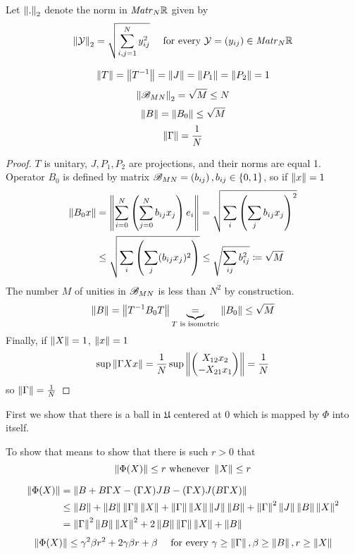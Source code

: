 \documentclass{article}
\begin{document}
Let \( \normex{2}{.} \) denote the norm in \( \matr{N}{\RR} \) given by
\[\normex{2}{\mathcal Y} = \sqrt{\sum_{i,j=1}^N y_{ij}^2} \quad\text{ for every } \mathcal Y = \left(y_{ij}\right) \in \matr{N}{\RR}\]
\begin{lemma}
    \[\norm T = \norm{T^{-1}} = \norm J = \norm{P_1} = \norm{P_2} = 1\]
    \[\normex{2}{\perturbmatrix{M}{N}} = \sqrt{M} \leq N\]
    \[\norm B = \norm{B_0} \leq \sqrt M\]
    \[\norm{\Gamma} = \frac{1}{N}\]
\end{lemma}
\begin{proof}
    \( T \) is unitary, \( J, P_1, P_2 \) are projections, and their norms are equal 1.
    Operator \( B_0 \) is defined by matrix \( \perturbmatrix{M}{N} = \left(b_{ij}\right), b_{ij}\in\{0,1\} \),
    so if \( \norm x = 1 \)
    \[
        \begin{split}
            \norm{B_0 x} &= \norm{\sum_{i=0}^N \left(\sum_{j=0}^N b_{ij} x_j\right) e_i}
            = \sqrt{\sum_i \left(\sum_j b_{ij} x_j\right)^2} \\
            &\leq \sqrt{\sum_i \left(\sum_j (b_{ij} x_j)^2\right)}
            \leq \sqrt{\sum_{ij} b_{ij}^2} \eqdef \sqrt M
        \end{split}
    \]
The number \( M \) of unities in \( \perturbmatrix{M}{N} \) is less than \( N^2 \) by construction.
\[\norm B = \norm{T^{-1} B_0 T} \underbrace{=}_{T \text{ is isometric}} \norm{B_0} \leq \sqrt M\]
    Finally, if \( \norm X = 1 \), \( \norm x = 1 \)
    \[\sup\norm{\Gamma X x} = \frac1N \sup\norm{\begin{pmatrix}X_{12}x_2 \\ -X_{21}x_1\end{pmatrix}}
                            = \frac1N\]
    so \( \norm\Gamma = \frac1N \)
\end{proof}

First we show that there is a ball in \( \mathfrak U \) centered at \( 0 \)
which is mapped by \( \Phi \) into itself.

To show that
means to show that there is such \( r>0 \) that
\[\norm{\Phi(X)} \leq r \text{ whenever } \norm{X}\leq r\]

    \begin{align*}
        \norm{\Phi(X)} &=    \norm{B + B\Gamma X - (\Gamma X) JB - (\Gamma X)J(B\Gamma X)} \\
                     &\leq \norm{B} + \norm{B}\norm{\Gamma} \norm{X} + \norm{\Gamma}\norm{X}\norm{J}\norm{B} + \norm{\Gamma}^2\norm{J}\norm{B}\norm{X}^2 \\
                     & = \norm{\Gamma}^2\norm{B}\norm{X}^2 + 2\norm{B}\norm{\Gamma}\norm{X} + \norm{B}
    \end{align*}
    \begin{equation}
        \label{eq:phi_norm_b1}
        \norm{\Phi(X)}
        \leq
            \gamma^2\beta r^2 + 2\gamma\beta r + \beta
            \quad \text{ for every } \gamma\geq\norm{\Gamma}, \beta\geq\norm{B}, r\geq\norm{X}
    \end{equation}
\end{document}
